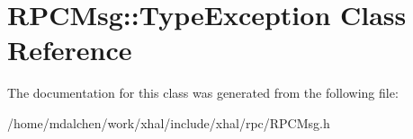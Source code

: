 \hypertarget{classRPCMsg_1_1TypeException}{
\section{RPCMsg::TypeException Class Reference}
\label{classRPCMsg_1_1TypeException}
}


The documentation for this class was generated from the following file:\begin{DoxyCompactItemize}
\item 
/home/mdalchen/work/xhal/include/xhal/rpc/RPCMsg.h\end{DoxyCompactItemize}
